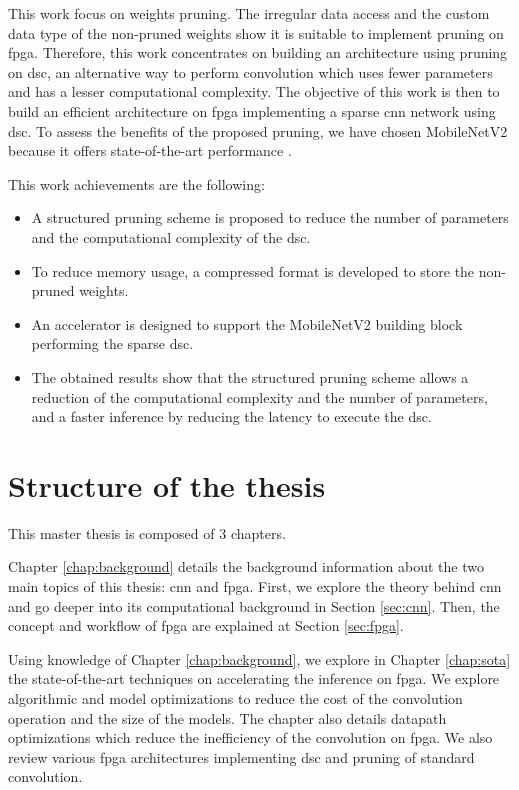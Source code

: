 This work focus on weights pruning. The irregular data access and the custom data type of the non-pruned weights show it is suitable to implement pruning on \acrshort{fpga}. Therefore, this work concentrates on building an architecture using pruning on \acrfull{dsc}, an alternative way to perform convolution which uses fewer parameters and has a lesser computational complexity. The objective of this work is then to build an efficient architecture on \acrshort{fpga} implementing a sparse \acrshort{cnn} network using \acrshort{dsc}. To assess the benefits of the proposed pruning, we have chosen MobileNetV2 because it offers state-of-the-art performance \cite{sandler_mobilenetv2_2018}.

This work achievements are the following:
%
\begin{itemize}
    \item A structured pruning scheme is proposed to reduce the number of parameters and the computational complexity of the \acrshort{dsc}.
    \item To reduce memory usage, a compressed format is developed to store the non-pruned weights.
    \item An accelerator is designed to support the MobileNetV2 building block performing the sparse \acrshort{dsc}.
    \item The obtained results show that the structured pruning scheme allows a reduction of the computational complexity and the number of parameters, and a faster inference by reducing the latency to execute the \acrshort{dsc}.
\end{itemize}
%
%
\section*{Structure of the thesis}
%
%
This master thesis is composed of 3 chapters.

Chapter \ref{chap:background} details the background information about the two main topics of this thesis: \acrshort{cnn} and \acrshort{fpga}. First, we explore the theory behind \acrshort{cnn} and go deeper into its computational background in Section \ref{sec:cnn}. Then, the concept and workflow of \acrshort{fpga} are explained at Section \ref{sec:fpga}.

Using knowledge of Chapter \ref{chap:background}, we explore in Chapter \ref{chap:sota} the state-of-the-art techniques on accelerating the inference on \acrshort{fpga}. We explore algorithmic and model optimizations to reduce the cost of the convolution operation and the size of the models. The chapter also details datapath optimizations which reduce the inefficiency of the convolution on \acrshort{fpga}. We also review various \acrshort{fpga} architectures implementing \acrshort{dsc} and pruning of standard convolution.

